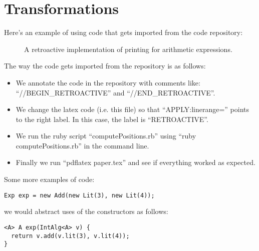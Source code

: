 \section{Transformations}\label{retroimp}

Here's an example of using code that gets imported from the code repository:

\begin{figure}[tb]
\vspace{-.1in}
\caption{A retroactive implementation of printing for arithmetic expressions.\label{retroactive}}
\end{figure}

The way the code gets imported from the repository is as follows:

\begin{itemize}

\item We annotate the code in the repository with comments like: ``//BEGIN\_RETROACTIVE''
  and ``//END\_RETROACTIVE''.

\item We change the latex code (i.e. this file) so that
  ``APPLY:linerange='' points to the right label. In this case, the
  label is ``RETROACTIVE''.

\item We run the ruby script ``computePositions.rb'' using ``ruby
  computePositions.rb'' in the command line.

\item Finally we run ``pdflatex paper.tex'' and see if everything
  worked as expected.

\end{itemize}

Some more examples of code:

\begin{lstlisting}[numbers=none]
Exp exp = new Add(new Lit(3), new Lit(4));
\end{lstlisting}

\noindent we would abstract uses of the constructors as follows:

\begin{lstlisting}[numbers=none] 
<A> A exp(IntAlg<A> v) {
  return v.add(v.lit(3), v.lit(4));
}
\end{lstlisting}